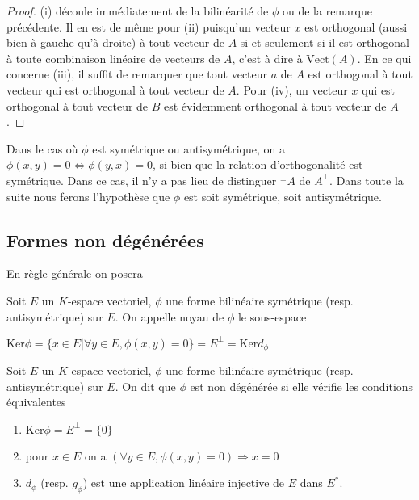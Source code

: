 \begin{proof}
(i) découle immédiatement de la bilinéarité de $\phi$ ou de la remarque précédente. Il en est de même pour (ii) puisqu'un vecteur $x$ est orthogonal (aussi bien à gauche qu'à droite) à tout vecteur de $A$ si et seulement si il est orthogonal à toute combinaison linéaire de vecteurs de $A$, c'est à dire à $\mathrm{Vect}(A)$. En ce qui concerne (iii), il suffit de remarquer que tout vecteur $a$ de $A$ est orthogonal à tout vecteur qui est orthogonal à tout vecteur de $A$. Pour (iv), un vecteur $x$ qui est orthogonal à tout vecteur de $B$ est évidemment orthogonal à tout vecteur de $A$.
\end{proof}

\begin{rem}
Dans le cas où $\phi$ est symétrique ou antisymétrique, on a $\phi(x,y) = 0 \Leftrightarrow \phi(y,x) = 0$, si bien que la relation d'orthogonalité est symétrique. Dans ce cas, il n'y a pas lieu de distinguer ${}^\bot A$ de $A^\bot$. Dans toute la suite nous ferons l'hypothèse que $\phi$ est soit symétrique, soit antisymétrique.
\end{rem}

\subsection{Formes non dégénérées}

En règle générale on posera

\begin{de}
Soit $E$ un $K$-espace vectoriel, $\phi$ une forme bilinéaire symétrique (resp. antisymétrique) sur $E$. On appelle noyau de $\phi$ le sous-espace

$\mathrm{Ker} \phi = \{x \in E | \forall y \in E, \phi(x,y) = 0\} = E^\bot = \mathrm{Ker} d_\phi$
\end{de}

\begin{de}
Soit $E$ un $K$-espace vectoriel, $\phi$ une forme bilinéaire symétrique (resp. antisymétrique) sur $E$. On dit que $\phi$ est non dégénérée si elle vérifie les conditions équivalentes
\begin{enumerate}
\item $\mathrm{Ker} \phi = E^\bot = \{0\}$
\item pour $x \in E$ on a $(\forall y \in E, \phi(x,y) = 0) \Rightarrow x = 0$
\item $d_\phi$ (resp. $g_\phi$) est une application linéaire injective de $E$ dans $E^*$.
\end{enumerate}
\end{de}

